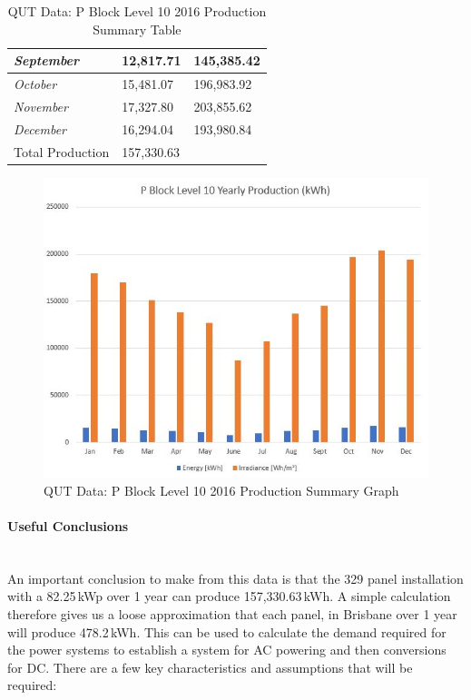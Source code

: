\begin{table}[H]
\begin{tabular}{|l|l|l|}
		\textit{September}                  & 12,817.71                                  & 145,385.42                                       \\ \hline
		\textit{October}                    & 15,481.07                                  & 196,983.92                                       \\ \hline
		\textit{November}                   & 17,327.80                                  & 203,855.62                                       \\ \hline
		\textit{December}                   & 16,294.04                                  & 193,980.84                                       \\ \hline
		Total Production                    & \multicolumn{2}{l|}{157,330.63}                                                               \\ \hline
	\end{tabular}
	\caption{QUT Data: P Block Level 10 2016 Production Summary Table}
	\label{table:qut-pv-lvl10-2016}
\end{table}

\begin{figure}[H]
	\hfill\includegraphics[width = 150mm]{images/metering/meteo/p-block-lvl10-yearly-production}\hspace*{\fill}
	\caption{QUT Data: P Block Level 10 2016 Production Summary Graph} 
	\label{fig:qut-pv-lvl10-2016}
\end{figure}  

\paragraph{Useful Conclusions}
~\\
An important conclusion to make from this data is that the 329 panel installation with a 82.25\,kWp over 1 year can produce 157,330.63\,kWh. A simple calculation therefore gives us a loose approximation that each panel, in Brisbane over 1 year will produce 478.2\,kWh. This can be used to calculate the demand required for the power systems to establish a system for AC powering and then conversions for DC. There are a few key characteristics and assumptions that will be required:

